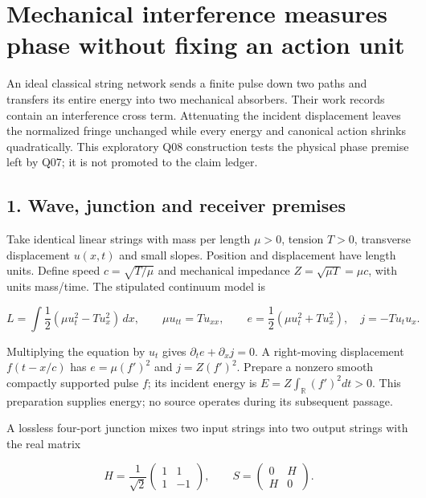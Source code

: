 \documentclass[11pt,a4paper]{article}
\begin{document}
\hypertarget{mechanical-interference-measures-phase-without-fixing-an-action-unit}{%
\section{Mechanical interference measures phase without fixing an action
unit}\label{mechanical-interference-measures-phase-without-fixing-an-action-unit}}

An ideal classical string network sends a finite pulse down two paths
and transfers its entire energy into two mechanical absorbers. Their
work records contain an interference cross term. Attenuating the
incident displacement leaves the normalized fringe unchanged while every
energy and canonical action shrinks quadratically. This exploratory Q08
construction tests the physical phase premise left by Q07; it is not
promoted to the claim ledger.

\hypertarget{wave-junction-and-receiver-premises}{%
\subsection{1. Wave, junction and receiver
premises}\label{wave-junction-and-receiver-premises}}

Take identical linear strings with mass per length \(\mu>0\), tension
\(T>0\), transverse displacement \(u(x,t)\) and small slopes. Position
and displacement have length units. Define speed \(c=\sqrt{T/\mu}\) and
mechanical impedance \(Z=\sqrt{\mu T}=\mu c\), with units mass/time. The
stipulated continuum model is

\[
L=\int\frac12(\mu u_t^2-Tu_x^2)\,dx,\qquad
\mu u_{tt}=Tu_{xx},\qquad
 e=\frac12(\mu u_t^2+Tu_x^2),\quad j=-Tu_tu_x.
\]

Multiplying the equation by \(u_t\) gives
\(\partial_t e+\partial_x j=0\). A right-moving displacement
\(f(t-x/c)\) has \(e=\mu(f')^2\) and \(j=Z(f')^2\). Prepare a nonzero
smooth compactly supported pulse \(f\); its incident energy is
\(E=Z\int_{\mathbb R}(f')^2dt>0\). This preparation supplies energy; no
source operates during its subsequent passage.

A lossless four-port junction mixes two input strings into two output
strings with the real matrix

\[
H=\frac1{\sqrt2}\begin{pmatrix}1&1\\1&-1\end{pmatrix},\qquad
S=\begin{pmatrix}0&H\\H&0\end{pmatrix}.
\]
\end{document}
